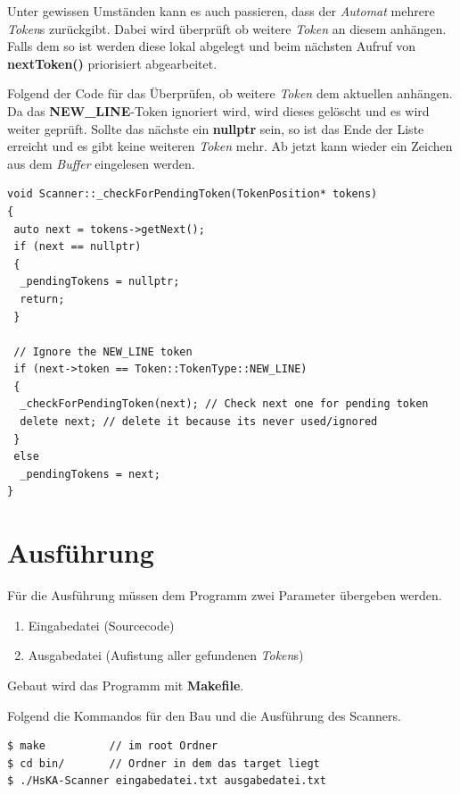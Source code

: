 \documentclass[
    a4paper
]{scrreprt}
\begin{document}
	Unter gewissen Umständen kann es auch passieren, dass der \textit{Automat} mehrere \textit{Token}s zurückgibt. Dabei wird überprüft ob weitere \textit{Token} an diesem anhängen. Falls dem so ist werden diese lokal abgelegt und beim nächsten Aufruf von \textbf{nextToken()} priorisiert abgearbeitet.
	
	Folgend der Code für das Überprüfen, ob weitere \textit{Token} dem aktuellen anhängen. Da das \textbf{NEW\_LINE}-Token ignoriert wird, wird dieses gelöscht und es wird weiter geprüft. Sollte das nächste ein \textbf{nullptr} sein, so ist das Ende der Liste erreicht und es gibt keine weiteren \textit{Token} mehr. Ab jetzt kann wieder ein Zeichen aus dem \textit{Buffer} eingelesen werden.
    
   	\begin{lstlisting}
void Scanner::_checkForPendingToken(TokenPosition* tokens)
{
 auto next = tokens->getNext();
 if (next == nullptr)
 {
  _pendingTokens = nullptr;
  return;
 }

 // Ignore the NEW_LINE token
 if (next->token == Token::TokenType::NEW_LINE)
 {
  _checkForPendingToken(next); // Check next one for pending token
  delete next; // delete it because its never used/ignored
 }
 else
  _pendingTokens = next;
}
    \end{lstlisting}


	\section{Ausführung}
	Für die Ausführung müssen dem Programm zwei Parameter übergeben werden.

		\begin{enumerate}
			\item Eingabedatei (Sourcecode)
			\item Ausgabedatei (Aufistung aller gefundenen \textit{Token}s)
		\end{enumerate}

	Gebaut wird das Programm mit \textbf{Makefile}.
	
	Folgend die Kommandos für den Bau und die Ausführung des Scanners.
	
	\begin{lstlisting}
$ make 			// im root Ordner
$ cd bin/		// Ordner in dem das target liegt
$ ./HsKA-Scanner eingabedatei.txt ausgabedatei.txt
	\end{lstlisting}
            
\end{document}
